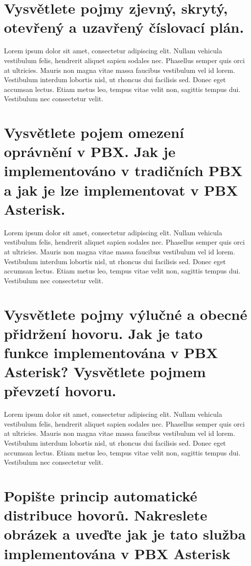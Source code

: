 \section{Vysvětlete pojmy zjevný, skrytý, otevřený a uzavřený číslovací plán.}

Lorem ipsum dolor sit amet, consectetur adipiscing elit. Nullam vehicula vestibulum felis, hendrerit aliquet sapien sodales nec. Phasellus semper quis orci at ultricies. Mauris non magna vitae massa faucibus vestibulum vel id lorem. Vestibulum interdum lobortis nisl, ut rhoncus dui facilisis sed. Donec eget accumsan lectus. Etiam metus leo, tempus vitae velit non, sagittis tempus dui. Vestibulum nec consectetur velit.

\section{Vysvětlete pojem omezení oprávnění v PBX. Jak je implementováno v tradičních PBX a jak je lze implementovat v PBX Asterisk.}

Lorem ipsum dolor sit amet, consectetur adipiscing elit. Nullam vehicula vestibulum felis, hendrerit aliquet sapien sodales nec. Phasellus semper quis orci at ultricies. Mauris non magna vitae massa faucibus vestibulum vel id lorem. Vestibulum interdum lobortis nisl, ut rhoncus dui facilisis sed. Donec eget accumsan lectus. Etiam metus leo, tempus vitae velit non, sagittis tempus dui. Vestibulum nec consectetur velit.

\section{Vysvětlete pojmy výlučné a obecné přidržení hovoru. Jak je tato funkce implementována v PBX Asterisk? Vysvětlete pojmem převzetí hovoru.}

Lorem ipsum dolor sit amet, consectetur adipiscing elit. Nullam vehicula vestibulum felis, hendrerit aliquet sapien sodales nec. Phasellus semper quis orci at ultricies. Mauris non magna vitae massa faucibus vestibulum vel id lorem. Vestibulum interdum lobortis nisl, ut rhoncus dui facilisis sed. Donec eget accumsan lectus. Etiam metus leo, tempus vitae velit non, sagittis tempus dui. Vestibulum nec consectetur velit.

\section{Popište princip automatické distribuce hovorů. Nakreslete obrázek a uveďte jak je tato služba implementována v PBX Asterisk}


